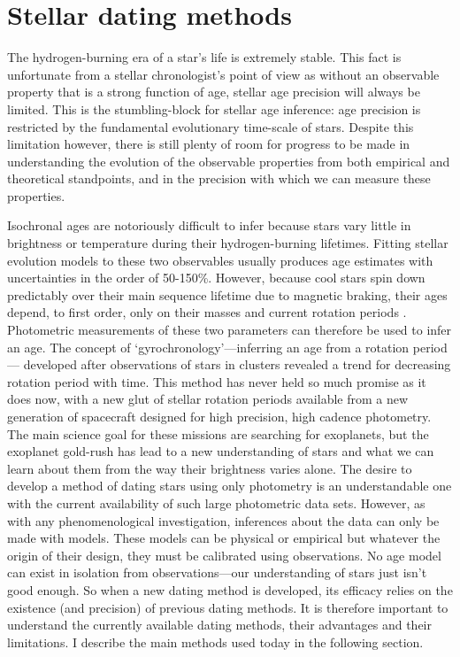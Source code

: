 \section{Stellar dating methods}

The hydrogen-burning era of a star's life is extremely stable.
This fact is unfortunate from a stellar chronologist's point of view as
without an observable property that is a strong function of age, stellar age
precision will always be limited.
This is the stumbling-block for stellar age inference: age precision is
restricted by the fundamental evolutionary time-scale of stars.
Despite this limitation however, there is still plenty of room for progress to
be made in understanding the evolution of the observable properties from both
empirical and theoretical standpoints, and in the precision with which we can
measure these properties.

Isochronal ages are notoriously difficult to infer because stars vary little
in brightness or temperature during their hydrogen-burning lifetimes.
Fitting stellar evolution models to these two observables usually produces age
estimates with uncertainties in the order of 50-150\%.
However, because cool stars spin down predictably over their main sequence
lifetime due to magnetic braking, their ages depend, to first order, only on
their masses and current rotation periods \citep[e.g.][]{skumanich, kawaler,
barnes}.
Photometric measurements of these two parameters can therefore be used to
infer an age.
The concept of `gyrochronology'---inferring an age from a rotation period---
developed after observations of stars in clusters revealed a trend for
decreasing rotation period with time.
This method has never held so much promise as it does now, with a new glut of
stellar rotation periods available from a new generation of spacecraft
designed for high precision, high cadence photometry.
The main science goal for these missions are searching for exoplanets, but the
exoplanet gold-rush has lead to a new understanding of stars and what we can
learn about them from the way their brightness varies alone.
The desire to develop a method of dating stars using only photometry is an
understandable one with the current availability of such large photometric
data sets.
However, as with any phenomenological investigation, inferences about the data
can only be made with models.
These models can be physical or empirical but whatever the origin of their
design, they must be calibrated using observations.
No age model can exist in isolation from observations---our understanding of
stars just isn't good enough.
So when a new dating method is developed, its efficacy relies on the existence
(and precision) of previous dating methods.
It is therefore important to understand the currently available dating
methods, their advantages and their limitations.
I describe the main methods used today in the following section.

